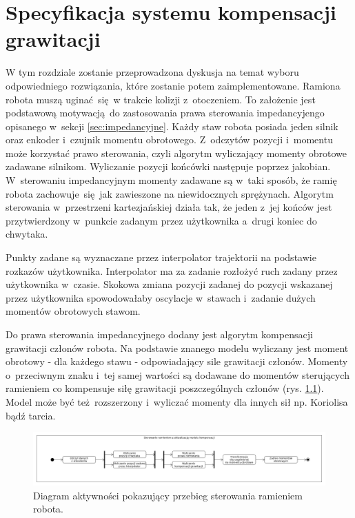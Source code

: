 
\chapter{Specyfikacja systemu kompensacji grawitacji\label{chap:implementacja_systemu}}
W tym rozdziale zostanie przeprowadzona dyskusja na temat wyboru odpowiedniego rozwiązania, które zostanie potem zaimplementowane. Ramiona robota muszą uginać się w trakcie kolizji z~otoczeniem. To założenie jest podstawową motywacją do zastosowania prawa sterowania impedancyjengo opisanego w~sekcji \ref{sec:impedancyjne}. Każdy staw robota posiada jeden silnik oraz enkoder i~czujnik momentu obrotowego. Z~odczytów pozycji i~momentu może korzystać prawo sterowania, czyli algorytm wyliczający momenty obrotowe zadawane silnikom. Wyliczanie pozycji końcówki następuje poprzez jakobian. W~sterowaniu impedancyjnym momenty zadawane są w~taki sposób, że ramię robota zachowuje się jak zawieszone na niewidocznych sprężynach. Algorytm sterowania w~przestrzeni kartezjańskiej działa tak, że jeden z~jej końców jest przytwierdzony w~punkcie zadanym przez użytkownika a~drugi koniec do chwytaka. 

Punkty zadane są wyznaczane przez interpolator trajektorii na podstawie rozkazów użytkownika. Interpolator ma za zadanie rozłożyć ruch zadany przez użytkownika w~czasie. Skokowa zmiana pozycji zadanej do pozycji wskazanej przez użytkownika spowodowałaby oscylacje w~stawach i~zadanie dużych momentów obrotowych stawom.

Do prawa sterowania impedancyjnego dodany jest algorytm kompensacji grawitacji członów robota. Na podstawie znanego modelu wyliczany jest moment obrotowy - dla każdego stawu - odpowiadający sile grawitacji członów. Momenty o~przeciwnym znaku i~tej samej wartości są dodawane do momentów sterujących ramieniem co kompensuje siłę grawitacji poszczególnych członów (rys. \ref{fig:sterowanie}). Model może być też rozszerzony i~wyliczać momenty dla innych sił np. Koriolisa bądź tarcia.

\begin{figure}
	\centering
	\includegraphics[width=.99\textwidth]{images/kompensacja.png}
	\caption{Diagram aktywności pokazujący przebieg sterowania ramieniem robota.}
	\label{fig:sterowanie}
\end{figure}

